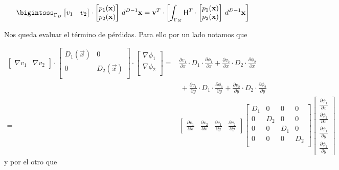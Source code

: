 \documentclass[
  12pt,
  a4paper,
  table]{scrbook}
\theoremstyle{plain}
\theoremstyle{definition}
\theoremstyle{plain}
\theoremstyle{plain}
\theoremstyle{remark}
\begin{document}
\[
\bigintsss_{\Gamma_D}
\begin{bmatrix}
 v_1 & v_2
\end{bmatrix}
\cdot
\begin{bmatrix}
 p_1(\vec{x}) \\
 p_2(\vec{x}) \\
\end{bmatrix}
\, d^{D-1}\vec{x}
=
\vec{v}^T
\cdot
\left[
\int_{\Gamma_N}
\mat{H}^T
\cdot
\begin{bmatrix}
 p_1(\vec{x}) \\
 p_2(\vec{x}) \\
\end{bmatrix}
\, d^{D-1}\vec{x}
\right]
\]

Nos queda evaluar el término de pérdidas. Para ello por un lado notamos
que

\[
\begin{aligned}
\begin{bmatrix}
 \nabla v_1 & \nabla v_2
\end{bmatrix}
\cdot
\begin{bmatrix}
D_1(\vec{x}) & 0 \\
0 & D_2(\vec{x}) \\
\end{bmatrix}
\cdot
\begin{bmatrix}
\nabla \phi_1  \\
\nabla \phi_2  \\
\end{bmatrix}
=&
   \frac{\partial v_1}{\partial x} \cdot D_1 \cdot \frac{\partial \phi_1}{\partial x}
 + \frac{\partial v_2}{\partial x} \cdot D_2 \cdot \frac{\partial \phi_2}{\partial x} \\
&~
 + \frac{\partial v_1}{\partial y} \cdot D_1 \cdot \frac{\partial \phi_1}{\partial y}
 + \frac{\partial v_2}{\partial y} \cdot D_2 \cdot \frac{\partial \phi_2}{\partial y} \\
=&
\begin{bmatrix}
\frac{\partial v_1}{\partial x} &
\frac{\partial v_2}{\partial x} &
\frac{\partial v_1}{\partial y} &
\frac{\partial v_2}{\partial y}
\end{bmatrix}
\begin{bmatrix}
D_1 & 0 & 0 & 0 \\
0 & D_2 & 0 & 0 \\
0 & 0 & D_1 & 0 \\
0 & 0 & 0 & D_2 \\
\end{bmatrix}
\begin{bmatrix}
\frac{\partial \phi_1}{\partial x} \\
\frac{\partial \phi_2}{\partial x} \\
\frac{\partial \phi_1}{\partial y} \\
\frac{\partial \phi_2}{\partial y}
\end{bmatrix}
\end{aligned}
\] y por el otro que
\end{document}
